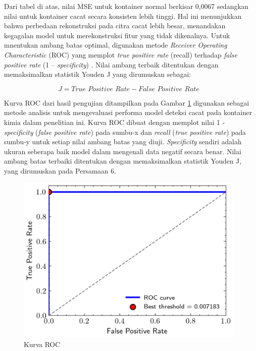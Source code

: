 Dari tabel di atas, nilai MSE untuk kontainer normal berkisar 0,0067
sedangkan nilai untuk kontainer cacat secara konsisten lebih tinggi.
Hal ini menunjukkan bahwa perbedaan rekonstruksi pada citra cacat
lebih besar, menandakan kegagalan model untuk merekonstruksi fitur
yang tidak dikenalnya. Untuk mnentukan ambang batas optimal,
digunakan metode \textit{Receiver Operating Characteristic} (ROC)
yang memplot \textit{true positive rate} (recall) terhadap
\textit{false positive rate} (1 – \textit{specificity}) \citep{28}.
Nilai ambang terbaik ditentukan dengan memaksimalkan statistik Youden
J yang dirumuskan sebagai:

\begin{equation}
  J = \textit{True Positive Rate} - \textit{False Positive Rate}
\end{equation}

Kurva ROC dari hasil pengujian ditampilkan pada Gambar \ref{fig:roc}
digunakan sebagai metode analisis untuk mengevaluasi performa model
deteksi cacat pada kontainer kimia dalam penelitian ini. Kurva ROC dibuat
dengan memplot nilai 1 - \textit{specificity} (\textit{false positive
rate}) pada sumbu-x dan \textit{recall} (\textit{true positive rate})
pada sumbu-y untuk setiap nilai ambang batas yang diuji.
\textit{Specificity} sendiri adalah ukuran seberapa baik model dalam
mengenali data negatif secara benar. Nilai ambang batas terbaiki
ditentukan dengan memaksimalkan statistik Youden J, yang dirumuskan
pada Persamaan 6.

\begin{figure}[H]
  \centering
  \includegraphics[width=\textwidth]{gambar/roc.png}
  \caption{Kurva ROC}
  \label{fig:roc}
\end{figure}
\vspace{-1em}


